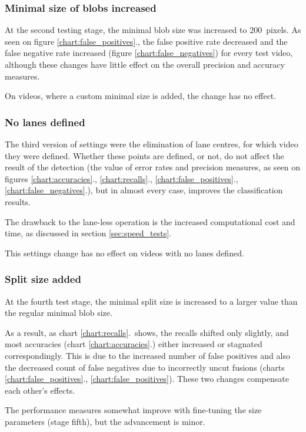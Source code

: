 \subsubsection{Minimal size of blobs increased}\label{sec:ver_2}
At the second testing stage, the minimal blob size was increased to \SI{200}{pixels}.
As seen on figure \ref{chart:false_positives}., the false positive rate decreased and the false negative rate increased (figure \ref{chart:false_negatives}) for every test video, although these changes have little effect on the overall precision and accuracy measures.

On videos, where a custom minimal size is added, the change has no effect.

\subsubsection{No lanes defined}\label{sec:ver_3}
The third version of settings were the elimination of lane centres, for which video they were defined.
Whether these points are defined, or not, do not affect the result of the detection (the value of error rates and precision measures, as seen on figures \ref{chart:accuracies}., \ref{chart:recalls}., \ref{chart:false_positives}., \ref{chart:false_negatives}.), but in almost every case, improves the classification results.

The drawback to the lane-less operation is the increased computational cost and time, as discussed in section \ref{sec:speed_tests}.

This settings change has no effect on videos with no lanes defined.

\subsubsection{Split size added}\label{sec:ver_4}
At the fourth test stage, the minimal split size is increased to a larger value than the regular minimal blob size.

As a result, as chart \ref{chart:recalls}.~shows, the recalls shifted only slightly, and most accuracies (chart \ref{chart:accuracies}.) either increased or stagnated correspondingly.
This is due to the increased number of false positives and also the decreased count of false negatives due to incorrectly uncut fusions (charts \ref{chart:false_positives}., \ref{chart:false_positives}). These two changes compensate each other's effects.

The performance measures somewhat improve with fine-tuning the size parameters (stage fifth), but the advancement is minor.

